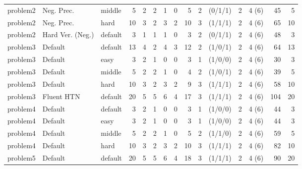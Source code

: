 \begin{table}[htbp]
{\begin{tabular}{lll rrrrrr rr rr rr}
problem2 & Neg. Prec. & middle & 5 & 2 & 2 & 1 & 0 & 5 & 2 & (0/1/1) & 2 & 4 (6) & 45 & 5 \\
problem2 & Neg. Prec. & hard & 10 & 3 & 2 & 3 & 2 & 10 & 3 & (1/1/1) & 2 & 4 (6) & 65 & 10 \\
problem2 & Hard Ver. (Neg.) & default & 3 & 1 & 1 & 1 & 0 & 3 & 2 & (0/1/1) & 2 & 4 (6) & 48 & 3 \\
\midrule
problem3 & Default & default & 13 & 4 & 2 & 4 & 3 & 12 & 2 & (1/0/1) & 2 & 4 (6) & 64 & 13 \\
problem3 & Default & easy & 3 & 2 & 1 & 0 & 0 & 3 & 1 & (1/0/0) & 2 & 4 (6) & 30 & 3 \\
problem3 & Default & middle & 5 & 2 & 2 & 1 & 0 & 4 & 2 & (1/0/1) & 2 & 4 (6) & 39 & 5 \\
problem3 & Default & hard & 10 & 3 & 2 & 3 & 2 & 9 & 3 & (1/1/1) & 2 & 4 (6) & 58 & 10 \\
problem3 & Fluent HTN & default & 20 & 5 & 5 & 6 & 4 & 17 & 3 & (1/1/1) & 2 & 4 (6) & 104 & 20 \\
\midrule
problem4 & Default & default & 3 & 2 & 1 & 0 & 0 & 3 & 1 & (1/0/0) & 2 & 4 (6) & 44 & 3 \\
problem4 & Default & easy & 3 & 2 & 1 & 0 & 0 & 3 & 1 & (1/0/0) & 2 & 4 (6) & 44 & 3 \\
problem4 & Default & middle & 5 & 2 & 2 & 1 & 0 & 5 & 2 & (1/1/0) & 2 & 4 (6) & 59 & 5 \\
problem4 & Default & hard & 10 & 3 & 2 & 3 & 2 & 10 & 3 & (1/1/1) & 2 & 4 (6) & 82 & 10 \\
\midrule
problem5 & Default & default & 20 & 5 & 5 & 6 & 4 & 18 & 3 & (1/1/1) & 2 & 4 (6) & 90 & 20 \\
\bottomrule
\end{tabular}%
}
\end{table}
